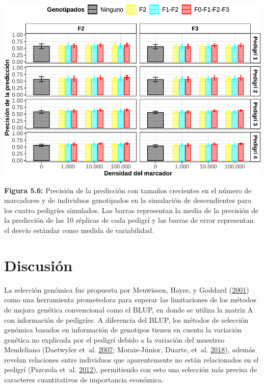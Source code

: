 \documentclass[11pt,spanish,a4paper,oneside,]{book} %
\begin{document}
\begin{center}\includegraphics[width=1\linewidth]{figures/Cor_F2_F3} \end{center}

\noindent
\textbf{Figura 5.6:} Precisión de la predicción con tamaños crecientes en el número de marcadores y de individuos genotipados en la simulación de descendientes para los cuatro pedigríes simulados. Las barras representan la media de la precisión de la predicción de las 10 réplicas de cada pedigrí y las barras de error representan el desvío estándar como medida de variabilidad.

\hypertarget{discusiuxf3n}{%
\chapter{Discusión}\label{discusiuxf3n}}

La selección genómica fue propuesta por Meuwissen, Hayes, y Goddard (\protect\hyperlink{ref-cite:8}{2001}) como una herramienta prometedora para superar las limitaciones de los métodos de mejora genética convencional como el BLUP, en donde se utiliza la matriz A con información de pedigríes. A diferencia del BLUP, los métodos de selección genómica basados en información de genotipos tienen en cuenta la variación genética no explicada por el pedigrí debido a la variación del muestreo Mendeliano (Daetwyler et~al. \protect\hyperlink{ref-cite:40}{2007}; Morais-Júnior, Duarte, et~al. \protect\hyperlink{ref-cite:69}{2018}), además revelan relaciones entre individuos que aparentemente no están relacionados en el pedigrí (Pszczola et~al. \protect\hyperlink{ref-cite:74}{2012}), permitiendo con esto una selección más precisa de caracteres cuantitativos de importancia económica.
\end{document}
